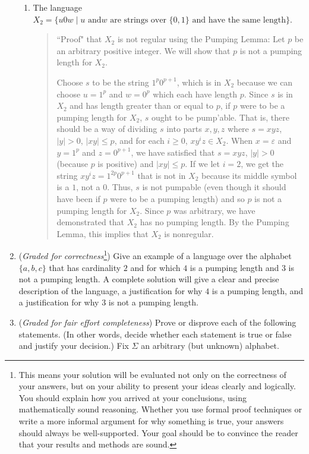 \documentclass[12pt, oneside]{article}
\begin{document}
\begin{enumerate}
\begin{enumerate}
\item The language $X_2 = \{ u0w \mid \text{$u$ and
$w$ are strings over $\{0,1\}$ and have the same length} \}$.

\begin{quote}
``Proof" that $X_2$ is not regular using the Pumping Lemma: Let $p$ be 
an arbitrary positive integer. We will show that $p$ is not a pumping length for $X_2$. 

Choose $s$ to be the string $1^{p} 0^{p+1}$, which is in $X_2$ because
we can choose $u = 1^p$ and $w = 0^p$ which each have length $p$.
Since $s$ is in $X_2$ and has length greater than or equal to $p$, if $p$ were to be a
pumping length for $X_2$, $s$ ought to be pump'able. 
That is, there should be a way of dividing $s$ into parts $x,y,z$ where $s=xyz$,
$|y| >0$, $|xy| \leq p$, and for each $i \geq 0$, $xy^iz \in X_2$.
When $x = \varepsilon$ and $y = 1^{p}$ and $z = 0^{p+1}$,
we have satisfied that $s = xyz$, $|y| > 0$ (because $p$ is positive) and $|xy| \leq p$.
If we let $i=2$, we get 
the string $xy^iz = 1^{2p}0^{p+1}$ that is not in $X_2$ because its middle symbol is a $1$, not a $0$. 
Thus, $s$ is not pumpable (even though it should have been if $p$ were to be a pumping length)
and so $p$ is not a pumping length for $X_2$.  Since $p$ was arbitrary, we have
demonstrated that $X_2$ has no pumping length.  By the Pumping Lemma, this implies that 
$X_2$ is nonregular.
\end{quote}
\end{enumerate}

\item ({\it Graded for correctness}\footnote{This means your solution will be
evaluated not only on the correctness of your answers, but on your ability to 
present your ideas clearly and logically. You should explain how you arrived at 
your conclusions, using  mathematically sound reasoning. Whether you use formal proof techniques or 
write a more informal argument for why 
something is true, your answers should always be well-supported. Your goal 
should be to convince the reader that 
your results and methods are sound.}) Give an example of a language
over the alphabet $\{a,b,c\}$ that has cardinality $2$ and for which $4$ is a pumping length
and $3$ is not a pumping length.  A complete solution will give a clear and precise
description of the language, a justification for why $4$ is a pumping length, and a 
justification for why $3$ is not a pumping length.

\item  ({\it Graded for fair effort completeness})
Prove or disprove each of the following statements. (In other words, 
decide whether each statement is true or false and justify your decision.)
Fix $\Sigma$ an arbitrary (but unknown) alphabet.


\end{enumerate}
\end{document}
